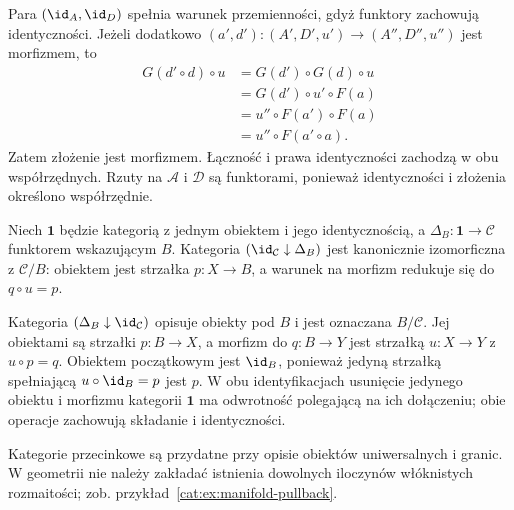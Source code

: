 Para $(\id_A,\id_D)$ spełnia warunek przemienności, gdyż funktory zachowują identyczności. Jeżeli dodatkowo $(a',d'):(A',D',u')\to(A'',D'',u'')$ jest morfizmem, to
\[
\begin{aligned}
G(d'\circ d)\circ u
&=G(d')\circ G(d)\circ u\\
&=G(d')\circ u'\circ F(a)\\
&=u''\circ F(a')\circ F(a)\\
&=u''\circ F(a'\circ a).
\end{aligned}
\]
Zatem złożenie jest morfizmem. Łączność i prawa identyczności zachodzą w obu współrzędnych. Rzuty na $\mathcal A$ i $\mathcal D$ są funktorami, ponieważ identyczności i złożenia określono współrzędnie.

\begin{przyklad}
Niech $\mathbf 1$ będzie kategorią z jednym obiektem i jego identycznością, a $\Delta_B:\mathbf 1\to\mathcal C$ funktorem wskazującym $B$. Kategoria $(\id_{\mathcal C}\downarrow\Delta_B)$ jest kanonicznie izomorficzna z $\mathcal C/B$: obiektem jest strzałka $p:X\to B$, a warunek na morfizm redukuje się do $q\circ u=p$.

Kategoria $(\Delta_B\downarrow\id_{\mathcal C})$ opisuje obiekty pod $B$ i jest oznaczana $B/\mathcal C$. Jej obiektami są strzałki $p:B\to X$, a morfizm do $q:B\to Y$ jest strzałką $u:X\to Y$ z $u\circ p=q$. Obiektem początkowym jest $\id_B$, ponieważ jedyną strzałką spełniającą $u\circ\id_B=p$ jest $p$. W obu identyfikacjach usunięcie jedynego obiektu i morfizmu kategorii $\mathbf 1$ ma odwrotność polegającą na ich dołączeniu; obie operacje zachowują składanie i identyczności.
\end{przyklad}

Kategorie przecinkowe są przydatne przy opisie obiektów uniwersalnych i granic. W geometrii nie należy zakładać istnienia dowolnych iloczynów włóknistych rozmaitości; zob. przykład~\ref{cat:ex:manifold-pullback}.


